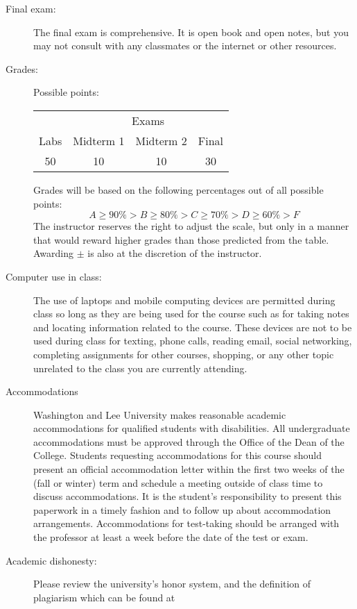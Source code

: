 \documentclass[12pt]{article}
\begin{document}
\begin{description}
\item[Final exam:]  The final exam is comprehensive.  It is open
book and open notes, but you may not consult with any classmates
or the internet or other resources.


\item[Grades:]  Possible points:

\begin{center}
\begin{tabular}{c|ccc}
 & \multicolumn{3}{c}{Exams}\\
Labs & Midterm 1 & Midterm 2 & Final \\
50 & 10 & 10 & 30 \\
\end{tabular}
\end{center}

Grades will be based on the following percentages
out of all possible points:
\[
A \geq 90\% > B \geq 80\% > C \geq 70\% > D \geq 60\% > F
\]
The instructor reserves the right to adjust the scale,
but only in a manner that would reward higher grades than
those predicted from the table. Awarding $\pm$ is also at
the discretion of the instructor.


\item[Computer use in class:]
The use of laptops and mobile computing devices are 
permitted during class so long as they are being used 
for the course such as for taking notes and locating
information related to the course. These devices are
not to be used during class for texting, phone calls, 
reading email, social networking, completing assignments
for other courses, shopping, or any other topic unrelated
to the class you are currently attending.

\item[Accommodations]
Washington and Lee University makes reasonable academic 
accommodations for qualified students with disabilities. 
All undergraduate accommodations must be approved through 
the Office of the Dean of the College. Students requesting 
accommodations for this course should present an official 
accommodation letter within the first two weeks of the 
(fall or winter) term and schedule a meeting outside of 
class time to discuss accommodations. It is the student’s 
responsibility to present this paperwork in a timely 
fashion and to follow up about accommodation arrangements. 
Accommodations for test-taking should be arranged with the 
professor at least a week before the date of the test or exam.

     
\item[Academic dishonesty:] Please review the university's
honor system, and the definition of plagiarism
which can be found at


\end{description}
\end{document}
